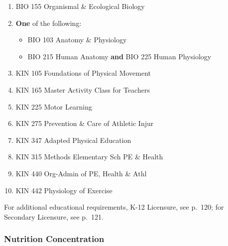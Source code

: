 \documentclass[
  letterpaper,
]{scrbook}
\providecommand{\tightlist}{%
  \setlength{\itemsep}{0pt}\setlength{\parskip}{0pt}}
\begin{document}
\begin{enumerate}
\def\labelenumi{\arabic{enumi}.}
\tightlist
\item
  BIO 155 Organismal \& Ecological Biology\\
\item
  \textbf{One} of the following:

  \begin{itemize}
  \tightlist
  \item
    BIO 103 Anatomy \& Physiology\\
  \item
    BIO 215 Human Anatomy \textbf{and} BIO 225 Human Physiology\\
  \end{itemize}
\item
  KIN 105 Foundations of Physical Movement\\
\item
  KIN 165 Master Activity Class for Teachers\\
\item
  KIN 225 Motor Learning\\
\item
  KIN 275 Prevention \& Care of Athletic Injur\\
\item
  KIN 347 Adapted Physical Education\\
\item
  KIN 315 Methods Elementary Sch PE \& Health\\
\item
  KIN 440 Org-Admin of PE, Health \& Athl\\
\item
  KIN 442 Physiology of Exercise
\end{enumerate}

For additional educational requirements, K-12 Licensure, see p.~120; for
Secondary Licensure, see p.~121.

\subsubsection{Nutrition Concentration}\label{nutrition-concentration}
\end{document}
